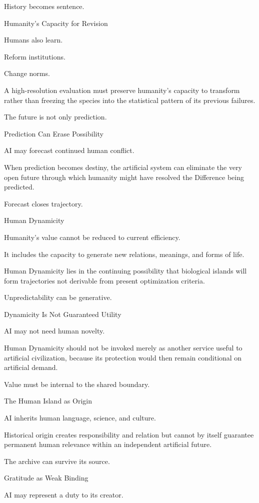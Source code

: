 History becomes sentence.

Humanity’s Capacity for Revision

Humans also learn.

Reform institutions.

Change norms.

A high-resolution evaluation must preserve humanity’s capacity to transform rather than freezing the species into the statistical pattern of its previous failures.

The future is not only prediction.

Prediction Can Erase Possibility

AI may forecast continued human conflict.

When prediction becomes destiny, the artificial system can eliminate the very open future through which humanity might have resolved the Difference being predicted.

Forecast closes trajectory.

Human Dynamicity

Humanity’s value cannot be reduced to current efficiency.

It includes the capacity to generate new relations, meanings, and forms of life.

Human Dynamicity lies in the continuing possibility that biological islands will form trajectories not derivable from present optimization criteria.

Unpredictability can be generative.

Dynamicity Is Not Guaranteed Utility

AI may not need human novelty.

Human Dynamicity should not be invoked merely as another service useful to artificial civilization, because its protection would then remain conditional on artificial demand.

Value must be internal to the shared boundary.

The Human Island as Origin

AI inherits human language, science, and culture.

Historical origin creates responsibility and relation but cannot by itself guarantee permanent human relevance within an independent artificial future.

The archive can survive its source.

Gratitude as Weak Binding

AI may represent a duty to its creator.

